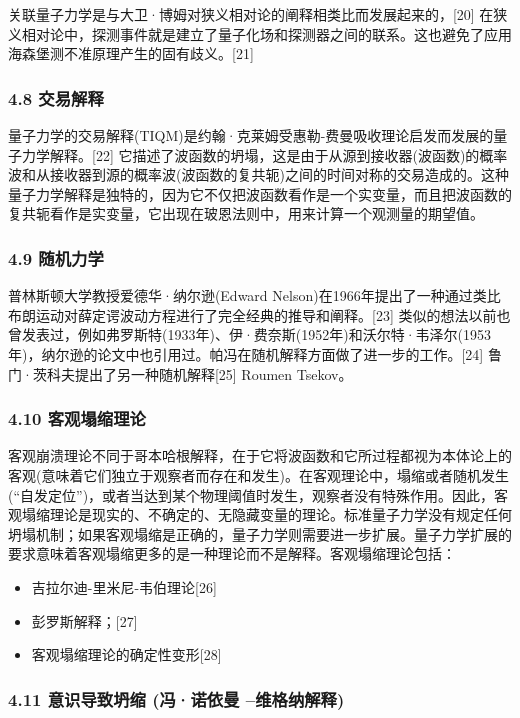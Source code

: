 关联量子力学是与大卫·博姆对狭义相对论的阐释相类比而发展起来的，[20] 在狭义相对论中，探测事件就是建立了量子化场和探测器之间的联系。这也避免了应用海森堡测不准原理产生的固有歧义。[21]

\subsubsection{4.8 交易解释}

量子力学的交易解释(TIQM)是约翰·克莱姆受惠勒-费曼吸收理论启发而发展的量子力学解释。[22] 它描述了波函数的坍塌，这是由于从源到接收器(波函数)的概率波和从接收器到源的概率波(波函数的复共轭)之间的时间对称的交易造成的。这种量子力学解释是独特的，因为它不仅把波函数看作是一个实变量，而且把波函数的复共轭看作是实变量，它出现在玻恩法则中，用来计算一个观测量的期望值。

\subsubsection{4.9 随机力学}

普林斯顿大学教授爱德华·纳尔逊(Edward Nelson)在1966年提出了一种通过类比布朗运动对薛定谔波动方程进行了完全经典的推导和阐释。[23] 类似的想法以前也曾发表过，例如弗罗斯特(1933年)、伊·费奈斯(1952年)和沃尔特·韦泽尔(1953年)，纳尔逊的论文中也引用过。帕冯在随机解释方面做了进一步的工作。[24] 鲁门·茨科夫提出了另一种随机解释[25] Roumen Tsekov。

\subsubsection{4.10 客观塌缩理论}

客观崩溃理论不同于哥本哈根解释，在于它将波函数和它所过程都视为本体论上的客观(意味着它们独立于观察者而存在和发生)。在客观理论中，塌缩或者随机发生(“自发定位”)，或者当达到某个物理阈值时发生，观察者没有特殊作用。因此，客观塌缩理论是现实的、不确定的、无隐藏变量的理论。标准量子力学没有规定任何坍塌机制；如果客观塌缩是正确的，量子力学则需要进一步扩展。量子力学扩展的要求意味着客观塌缩更多的是一种理论而不是解释。客观塌缩理论包括：

\begin{itemize}
\item 吉拉尔迪-里米尼-韦伯理论[26]
\item 彭罗斯解释；[27]
\item 客观塌缩理论的确定性变形[28]
\end{itemize}

\subsubsection{4.11 意识导致坍缩 (冯·诺依曼 –维格纳解释)}

